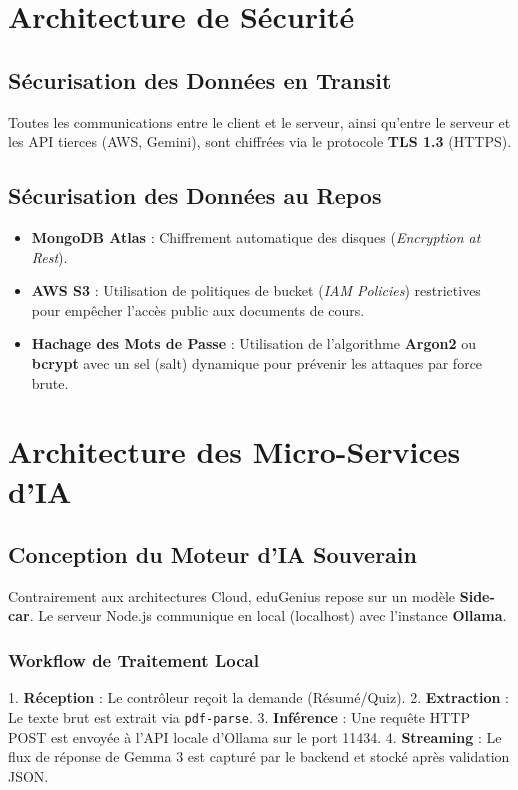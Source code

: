 \section{Architecture de Sécurité}
\subsection{Sécurisation des Données en Transit}
Toutes les communications entre le client et le serveur, ainsi qu'entre le serveur et les API tierces (AWS, Gemini), sont chiffrées via le protocole \textbf{TLS 1.3} (HTTPS).

\subsection{Sécurisation des Données au Repos}
\begin{itemize}
    \item \textbf{MongoDB Atlas} : Chiffrement automatique des disques (\textit{Encryption at Rest}).
    \item \textbf{AWS S3} : Utilisation de politiques de bucket (\textit{IAM Policies}) restrictives pour empêcher l'accès public aux documents de cours.
    \item \textbf{Hachage des Mots de Passe} : Utilisation de l'algorithme \textbf{Argon2} ou \textbf{bcrypt} avec un sel (salt) dynamique pour prévenir les attaques par force brute.
\end{itemize}

\section{Architecture des Micro-Services d'IA}
\subsection{Conception du Moteur d'IA Souverain}
Contrairement aux architectures Cloud, eduGenius repose sur un modèle \textbf{Side-car}. Le serveur Node.js communique en local (localhost) avec l'instance \textbf{Ollama}.

\subsubsection{Workflow de Traitement Local}
1. \textbf{Réception} : Le contrôleur reçoit la demande (Résumé/Quiz).
2. \textbf{Extraction} : Le texte brut est extrait via \texttt{pdf-parse}.
3. \textbf{Inférence} : Une requête HTTP POST est envoyée à l'API locale d'Ollama sur le port 11434.
4. \textbf{Streaming} : Le flux de réponse de Gemma 3 est capturé par le backend et stocké après validation JSON.

